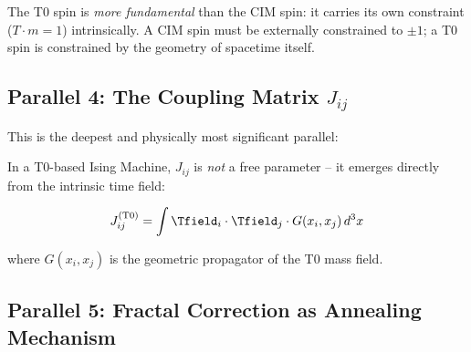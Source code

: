 \begin{important}
    The T0 spin is \emph{more fundamental} than the CIM spin: it carries its own
    constraint ($T \cdot m = 1$) intrinsically. A CIM spin must be externally
    constrained to $\pm 1$; a T0 spin is constrained by the geometry of spacetime itself.
\end{important}

\subsection{Parallel 4: The Coupling Matrix $J_{ij}$}
\label{subsec:coupling}

This is the deepest and physically most significant parallel:

\begin{table}[h]
    \centering
    \caption{Parallel 4: Coupling matrix -- the decisive difference}
    \label{tab:parallel4}
\end{table}

In a T0-based Ising Machine, $J_{ij}$ is \emph{not} a free parameter -- it emerges
directly from the intrinsic time field:

\begin{equation}
    J_{ij}^{(\text{T0})} = \int \Tfield_i \cdot \Tfield_j \cdot G(x_i, x_j) \, d^3x
    \label{eq:t0_coupling}
\end{equation}

where $G(x_i, x_j)$ is the geometric propagator of the T0 mass field.

\subsection{Parallel 5: Fractal Correction as Annealing Mechanism}

